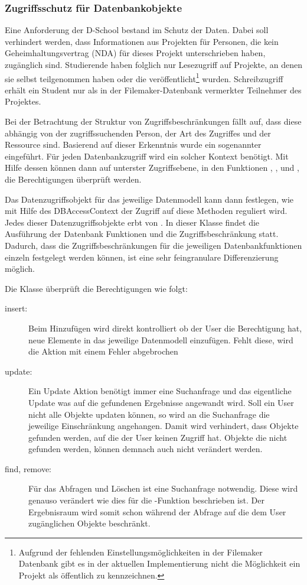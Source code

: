 \subsubsection{Zugriffsschutz für Datenbankobjekte}

Eine Anforderung der D-School bestand im Schutz der Daten. Dabei soll verhindert werden, dass Informationen aus Projekten für Personen, die kein Geheimhaltungsvertrag (NDA) für dieses Projekt unterschrieben haben, zugänglich sind. Studierende haben folglich nur Lesezugriff auf Projekte, an denen sie selbst teilgenommen haben oder die veröffentlicht\footnote{Aufgrund der fehlenden Einstellungsmöglichkeiten in der Filemaker Datenbank gibt es in der aktuellen Implementierung nicht die Möglichkeit ein Projekt als öffentlich zu kennzeichnen.} wurden. Schreibzugriff erhält ein Student nur als in der Filemaker-Datenbank vermerkter Teilnehmer des Projektes.

Bei der Betrachtung der Struktur von Zugriffsbeschränkungen fällt auf, dass diese abhängig von der zugriffssuchenden Person, der Art des Zugriffes und der Ressource sind. Basierend auf dieser Erkenntnis wurde ein sogenannter  eingeführt. Für jeden Datenbankzugriff wird ein solcher Kontext benötigt. Mit Hilfe dessen können dann auf unterster Zugriffsebene, in den Funktionen , ,  und , die Berechtigungen überprüft werden.

Das Datenzugriffsobjekt für das jeweilige Datenmodell kann dann festlegen, wie mit Hilfe des DBAccessContext der Zugriff auf diese Methoden reguliert wird. Jedes dieser Datenzugriffsobjekte erbt von . In dieser Klasse findet die Ausführung der Datenbank Funktionen und die Zugriffsbeschränkung statt. Dadurch, dass die Zugriffsbeschränkungen für die jeweiligen Datenbankfunktionen einzeln festgelegt werden können, ist eine sehr feingranulare Differenzierung möglich.

Die Klasse  überprüft die Berechtigungen wie folgt:
\begin{description}
\item[insert:] Beim Hinzufügen wird direkt kontrolliert ob der User die Berechtigung hat, neue Elemente in das jeweilige Datenmodell einzufügen. Fehlt diese, wird die Aktion mit einem Fehler abgebrochen
\item[update:] Ein Update Aktion benötigt immer eine Suchanfrage und das eigentliche Update was auf die gefundenen Ergebnisse angewandt wird. Soll ein User nicht alle Objekte updaten können, so wird an die Suchanfrage die jeweilige Einschränkung angehangen. Damit wird verhindert, dass Objekte gefunden werden, auf die der User keinen Zugriff hat. Objekte die nicht gefunden werden, können demnach auch nicht verändert werden.
\item[find, remove:] Für das Abfragen und Löschen ist eine Suchanfrage notwendig. Diese wird genauso verändert wie dies für die -Funktion beschrieben ist. Der Ergebnisraum wird somit schon während der Abfrage auf die dem User zugänglichen Objekte beschränkt.
\end{description}

